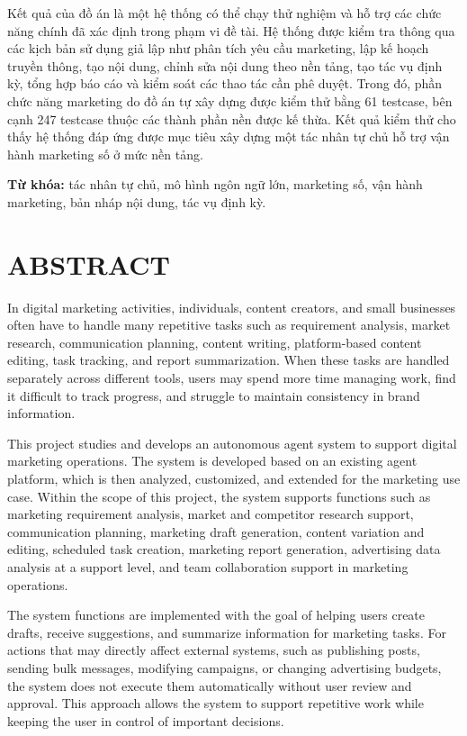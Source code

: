 \documentclass[a4paper]{article}
\begin{document}
Kết quả của đồ án là một hệ thống có thể chạy thử nghiệm và hỗ trợ các chức năng chính đã xác định trong phạm vi đề tài. Hệ thống được kiểm tra thông qua các kịch bản sử dụng giả lập như phân tích yêu cầu marketing, lập kế hoạch truyền thông, tạo nội dung, chỉnh sửa nội dung theo nền tảng, tạo tác vụ định kỳ, tổng hợp báo cáo và kiểm soát các thao tác cần phê duyệt. Trong đó, phần chức năng marketing do đồ án tự xây dựng được kiểm thử bằng 61 testcase, bên cạnh 247 testcase thuộc các thành phần nền được kế thừa. Kết quả kiểm thử cho thấy hệ thống đáp ứng được mục tiêu xây dựng một tác nhân tự chủ hỗ trợ vận hành marketing số ở mức nền tảng.

\textbf{Từ khóa:} tác nhân tự chủ, mô hình ngôn ngữ lớn, marketing số, vận hành marketing, bản nháp nội dung, tác vụ định kỳ.


\clearpage
\section*{ABSTRACT}
{}

In digital marketing activities, individuals, content creators, and small businesses often have to handle many repetitive tasks such as requirement analysis, market research, communication planning, content writing, platform-based content editing, task tracking, and report summarization. When these tasks are handled separately across different tools, users may spend more time managing work, find it difficult to track progress, and struggle to maintain consistency in brand information.

This project studies and develops an autonomous agent system to support digital marketing operations. The system is developed based on an existing agent platform, which is then analyzed, customized, and extended for the marketing use case. Within the scope of this project, the system supports functions such as marketing requirement analysis, market and competitor research support, communication planning, marketing draft generation, content variation and editing, scheduled task creation, marketing report generation, advertising data analysis at a support level, and team collaboration support in marketing operations.

The system functions are implemented with the goal of helping users create drafts, receive suggestions, and summarize information for marketing tasks. For actions that may directly affect external systems, such as publishing posts, sending bulk messages, modifying campaigns, or changing advertising budgets, the system does not execute them automatically without user review and approval. This approach allows the system to support repetitive work while keeping the user in control of important decisions.
\end{document}
